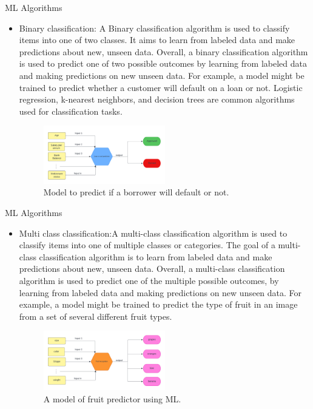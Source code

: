 \documentclass[11pt,notheorems,hyperref={pdfauthor=whatever}]{beamer}
\begin{document}
\begin{frame}{ML Algorithms}
\begin{itemize}
\item \alert{Binary classification:} A Binary classification algorithm is used to classify items into one of two classes. It aims to learn from labeled data and make predictions about new, unseen data. Overall, a binary classification algorithm is used to predict one of two possible outcomes by learning from labeled data and making predictions on new unseen data. For example, a model might be trained to predict whether a customer will default on a loan or not. Logistic regression, k-nearest neighbors, and decision trees are common algorithms used for classification tasks.
\begin{figure}
    \centering
    \includegraphics[width=0.5\textwidth]{figures/bi-classification.png}
    \caption{Model to predict if a  borrower will default or not.}
    \label{fig:binary classification}
\end{figure}

\end{itemize}
\end{frame}

\begin{frame}{ML Algorithms}
\begin{itemize}
\item \alert{Multi class classification:}A multi-class classification algorithm is used to classify items into one of multiple classes or categories. The goal of a multi-class classification algorithm is to learn from labeled data and make predictions about new, unseen data. Overall, a multi-class classification algorithm is used to predict one of the multiple possible outcomes, by learning from labeled data and making predictions on new unseen data. For example, a model might be trained to predict the type of fruit in an image from a set of several different fruit types.
\begin{figure}
    \centering
    \includegraphics[width=0.5\textwidth]{figures/fruit predictor.png}
    \caption{A model of fruit predictor using ML.}
    \label{fig:multiclass classification}
\end{figure}

\end{itemize}
\end{frame}
\end{document}
